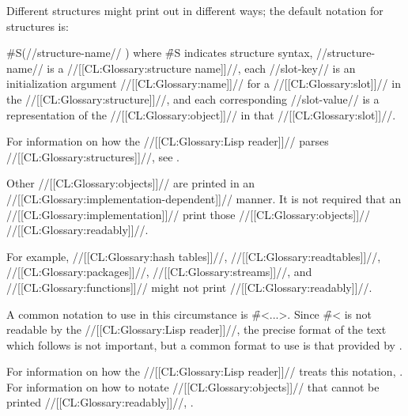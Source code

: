 
Different structures might print out in different ways;
the default notation for structures is:

\code
 #S(//structure-name// )
\endcode
where \f{\#S} indicates structure syntax,
//structure-name// is a //[[CL:Glossary:structure name]]//,
each //slot-key// is an initialization argument //[[CL:Glossary:name]]//
for a //[[CL:Glossary:slot]]// in the //[[CL:Glossary:structure]]//,
and each corresponding //slot-value// is a representation
of the //[[CL:Glossary:object]]// in that //[[CL:Glossary:slot]]//.



For information on how the //[[CL:Glossary:Lisp reader]]// parses //[[CL:Glossary:structures]]//,
see \secref\SharpsignS.

\endsubsubsection%



Other //[[CL:Glossary:objects]]// are printed in an //[[CL:Glossary:implementation-dependent]]// manner.
It is not required that an //[[CL:Glossary:implementation]]// print those //[[CL:Glossary:objects]]//
//[[CL:Glossary:readably]]//.

For example, //[[CL:Glossary:hash tables]]//, 
	     //[[CL:Glossary:readtables]]//,
             //[[CL:Glossary:packages]]//,
             //[[CL:Glossary:streams]]//,
         and //[[CL:Glossary:functions]]//
might not print //[[CL:Glossary:readably]]//.

A common notation to use in this circumstance is \f{\#<...>}.
Since \f{\#<} is not readable by the //[[CL:Glossary:Lisp reader]]//,
the precise format of the text which follows is not important,
but a common format to use is that provided by .

For information on how the //[[CL:Glossary:Lisp reader]]// treats this notation,
\seesection\SharpsignLeftAngle.
For information on how to notate //[[CL:Glossary:objects]]// that cannot be printed //[[CL:Glossary:readably]]//,
\seesection\SharpsignDot.

\endsubsubsection%

\endsubsection%






